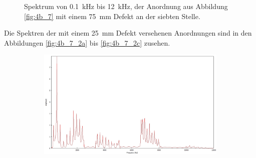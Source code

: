 \begin{figure}
\begin{subfigure}{0.34\textwidth}
\end{subfigure}
\caption{Spektrum von 0.1~kHz bis 12~kHz, der Anordnung aus Abbildung \ref{fig:4b_7} mit einem 75~mm Defekt an der siebten Stelle.}
\label{fig:4b_7_1c}
\end{figure}
Die Spektren der mit einem 25~mm Defekt versehenen Anordnungen sind in den Abbildungen \ref{fig:4b_7_2a} bis \ref{fig:4b_7_2c} zusehen.
\begin{figure}
\centering
\begin{subfigure}{0.65\textwidth}
\includegraphics[width=\textwidth]{content/messungen/Chapter4b/4b_7_2a.jpg}
\end{subfigure}
\begin{subfigure}{0.34\textwidth}

\end{subfigure}
\end{figure}
